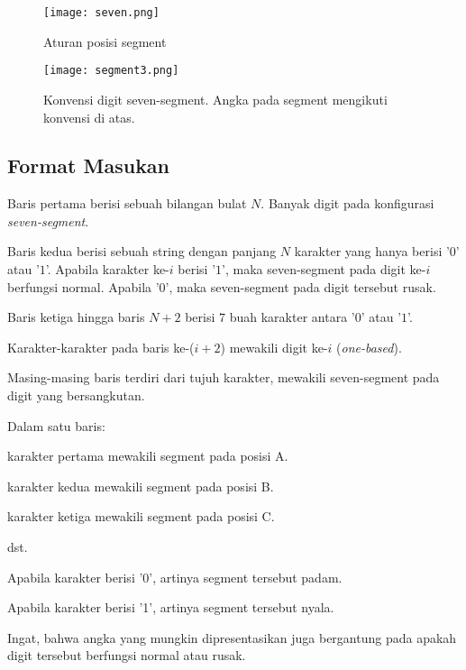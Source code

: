 \documentclass{article}
\begin{document}
\begin{figure}[h]
    \centering
    \texttt{[image: seven.png]}
    \caption{Aturan posisi segment}
    \label{fig:mesh1}
\end{figure}

\begin{figure}[h]
    \centering
    \texttt{[image: segment3.png]}
    \caption{Konvensi digit seven-segment. Angka pada segment mengikuti konvensi di atas.}
    \label{fig:mesh1}
\end{figure}

\subsection*{Format Masukan}
\par\noindent Baris pertama berisi sebuah bilangan bulat $N$. Banyak digit pada konfigurasi \textit{seven-segment}.
\newline
\par\noindent 
Baris kedua berisi sebuah string dengan panjang $N$ karakter yang hanya berisi '$0$' atau '$1$'. Apabila karakter ke-$i$ berisi '$1$', maka seven-segment pada digit ke-$i$ berfungsi normal. Apabila '$0$', maka seven-segment pada digit tersebut rusak.  
\newline
\par\noindent 
Baris ketiga hingga baris $N+2$ berisi $7$ buah karakter antara '$0$' atau '$1$'.
\par\noindent
Karakter-karakter pada baris ke-($i+2$) mewakili digit ke-$i$ (\textit{one-based}).
\par\noindent
Masing-masing baris terdiri dari tujuh karakter, mewakili seven-segment pada digit yang bersangkutan.
\newline
\par\noindent 
Dalam satu baris:
\par\noindent
karakter pertama mewakili segment pada posisi A.
\par\noindent
karakter kedua mewakili segment pada posisi B.
\par\noindent
karakter ketiga mewakili segment pada posisi C.
\par\noindent
dst.
\newline
\par\noindent
Apabila karakter berisi '0', artinya segment tersebut padam.
\par\noindent
Apabila karakter berisi '1', artinya segment tersebut nyala.  
\newline
\par\noindent 
Ingat, bahwa angka yang mungkin dipresentasikan juga bergantung pada apakah digit tersebut berfungsi normal atau rusak.
\end{document}

